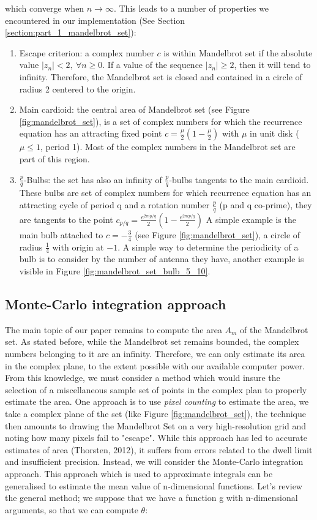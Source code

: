 \documentclass{article}
\begin{document}
    which converge when $n \rightarrow \infty$. This leads to a number of properties we encountered in our implementation (See Section \ref{section:part_1_mandelbrot_set}):
    \begin{enumerate}
        \item Escape criterion: a complex number $c$ is within Mandelbrot set if the absolute value $|z_n| < 2,\ \forall n \geq 0$. If a value of the sequence $|z_n| \geq 2$, then it will tend to infinity. Therefore, the Mandelbrot set is closed and contained in a circle of radius 2 centered to the origin.
        \item Main cardioid: the central area of Mandelbrot set (see Figure \ref{fig:mandelbrot_set}), is a set of complex numbers for which the recurrence equation has an attracting fixed point $c = \frac{\mu}{2}(1 - \frac{\mu}{2})$ with $\mu$ in unit disk ($\mu \leq 1$, period 1). Most of the complex numbers in the Mandelbrot set are part of this region.
        \item $\frac{p}{q}$-Bulbs: the set has also an infinity of $\frac{p}{q}$-bulbs tangents to the main cardioid. These bulbs are set of complex numbers for which recurrence equation has an attracting cycle of period q and a rotation number $\frac{p}{q}$ (p and q co-prime),  they are tangents to the point
        $c_{p/q} = \frac{e^{2 \pi i p/q}}{2}(1 - \frac{e^{2 \pi i p/q}}{2})$ A simple example is the main bulb attached to $c = -\frac{3}{4}$ (see Figure \ref{fig:mandelbrot_set}), a circle of radius $\frac{1}{4}$ with origin at $-1$. A simple way to determine the periodicity of a bulb is to consider by the number of antenna they have, another example is visible in Figure \ref{fig:mandelbrot_set_bulb_5_10}.
    \end{enumerate}

    \subsection*{Monte-Carlo integration approach}
    \label{subsection:monte_carlo_theory}
    The main topic of our paper remains to compute the area $A_m$ of the Mandelbrot set. As stated before, while the Mandelbrot set remains bounded, the complex numbers belonging to it are an infinity. Therefore, we can only estimate its area in the complex plane, to the extent possible with our available computer power.
    From this knowledge, we must consider a method which would insure the selection of a miscellaneous sample set of points in the complex plan to properly estimate the area. One approach is to use \emph{pixel counting} to estimate the area, we take a complex plane of the set (like Figure \ref{fig:mandelbrot_set}), the technique then amounts to drawing the Mandelbrot Set on a very high-resolution grid and noting how many pixels fail to "escape". While this approach has led to accurate estimates of area (Thorsten, 2012), it suffers from errors related to the dwell limit and insufficient precision. Instead, we will consider the Monte-Carlo integration approach. This approach which is  used to approximate integrals can be generalised to estimate the mean value of n-dimensional functions. Let's review the general method; we suppose that we have a function g with n-dimensional arguments, so that we can compute $\theta$:
\end{document}
